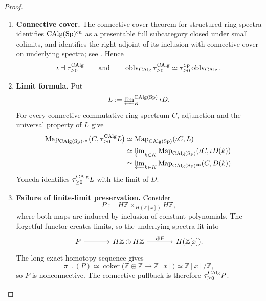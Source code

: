 \begin{proof}
\leavevmode
\begin{enumerate}[label=\textup{(\arabic*)}]
    \item \textbf{Connective cover.}
    The connective-cover theorem for structured ring spectra identifies
    \(\operatorname{CAlg}(\operatorname{Sp})^{\mathrm{cn}}\) as a presentable full subcategory closed under
    small colimits, and identifies the right adjoint of its inclusion with
    connective cover on underlying spectra; see
    \cite{LurieHigherAlgebra,LurieSAG}. Hence
    \[
        \iota\dashv\tau_{\geq0}^{\operatorname{CAlg}}
        \qquad\text{and}\qquad
        \operatorname{oblv}_{\operatorname{CAlg}}\tau_{\geq0}^{\operatorname{CAlg}}\simeq\tau_{\geq0}^{\operatorname{Sp}}\operatorname{oblv}_{\operatorname{CAlg}}.
    \]

    \item \textbf{Limit formula.}
    Put
    \[
        L:=\varprojlim\nolimits_K^{\operatorname{CAlg}(\operatorname{Sp})}\iota D.
    \]
    For every connective commutative ring spectrum \(C\), adjunction and the
    universal property of \(L\) give
    \[
    \begin{aligned}
        \operatorname{Map}_{\operatorname{CAlg}(\operatorname{Sp})^{\mathrm{cn}}}
        \bigl(C,\tau_{\geq0}^{\operatorname{CAlg}}L\bigr)
        &\simeq
        \operatorname{Map}_{\operatorname{CAlg}(\operatorname{Sp})}(\iota C,L)
        \\
        &\simeq
        \varprojlim\nolimits_{k\in K}
        \operatorname{Map}_{\operatorname{CAlg}(\operatorname{Sp})}(\iota C,\iota D(k))
        \\
        &\simeq
        \varprojlim\nolimits_{k\in K}
        \operatorname{Map}_{\operatorname{CAlg}(\operatorname{Sp})^{\mathrm{cn}}}(C,D(k)).
    \end{aligned}
    \]
    Yoneda identifies \(\tau_{\geq0}^{\operatorname{CAlg}}L\) with the limit of \(D\).

    \item \textbf{Failure of finite-limit preservation.}
    Consider
    \[
        P
        :=
        H\mathbb Z
        \times_{H(\mathbb Z[x])}
        H\mathbb Z,
    \]
    where both maps are induced by inclusion of constant polynomials. The
    forgetful functor creates limits, so the underlying spectra fit into
    \[
    \begin{tikzcd}[column sep=large]
    P
        \arrow[r]
    &
    H\mathbb Z\oplus H\mathbb Z
        \arrow[r, "{\mathrm{diff}}"]
    &
    H(\mathbb Z[x]).
    \end{tikzcd}
    \]
    The long exact homotopy sequence gives
    \[
        \pi_{-1}(P)
        \simeq
        \operatorname{coker}
        \bigl(
            \mathbb Z\oplus\mathbb Z\to\mathbb Z[x]
        \bigr)
        \simeq
        \mathbb Z[x]/\mathbb Z,
    \]
    so \(P\) is nonconnective. The connective pullback is therefore
    \(\tau_{\geq0}^{\operatorname{CAlg}}P\).
\end{enumerate}
\end{proof}


